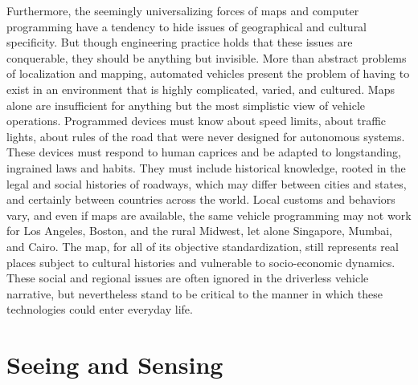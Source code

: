 Furthermore, the seemingly universalizing forces of maps and computer programming
have a tendency to hide issues of geographical and cultural
specificity.
But though engineering practice holds that these issues are
conquerable, they should be anything but invisible. More than
abstract problems of localization and mapping, automated vehicles
present the problem of having to exist in an environment that is
highly complicated, varied, and cultured. Maps alone are insufficient
for anything but the most simplistic view of vehicle operations.
Programmed devices
must know about speed limits, about traffic
lights, about rules of the road that were never designed for
autonomous systems. These devices must respond to human caprices and
be adapted to longstanding, ingrained laws and habits. They must
include historical knowledge, rooted in the legal and social histories
of roadways, which may differ between cities and states, and certainly
between countries across the world. Local customs and behaviors vary,
and even if maps are 
available, the same vehicle programming may not work for Los Angeles,
Boston, and the rural Midwest, let alone Singapore, Mumbai, and Cairo.
The map, for all of its objective standardization, still represents
real places subject to cultural histories and vulnerable to
socio-economic dynamics. These social and regional issues are often
ignored in the driverless vehicle narrative, but nevertheless stand to
be critical to the manner in which these technologies could
enter everyday life.



\section{Seeing and Sensing}

